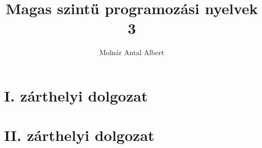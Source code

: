 \documentclass[a4paper]{article}
\begin{document}
\title{Magas szintű programozási nyelvek 3}
\author{Molnár Antal Albert}

\lstset{
    basicstyle=\footnotesize,
    float,
    floatplacement=H
}


\vspace*{\fill}
\begin{multicols}{2}[]
\maketitle\vfill\null
\columnbreak
\tableofcontents
\newpage
\end{multicols}
\vspace*{\fill}

\section{I. zárthelyi dolgozat}%
\label{sec:i_zh}


\newpage

\section{II. zárthelyi dolgozat}%
\label{sec:ii_zarthelyi_dolgozat}

\end{document}
